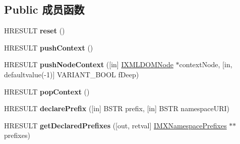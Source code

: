\subsection*{Public 成员函数}
\begin{DoxyCompactItemize}
\item 
\mbox{\label{interface_m_s_x_m_l2_1_1_i_v_b_m_x_namespace_manager_ab5f2c32051fd28c01e1dd0f8f3be944e}} 
H\+R\+E\+S\+U\+LT {\bfseries reset} ()
\item 
\mbox{\label{interface_m_s_x_m_l2_1_1_i_v_b_m_x_namespace_manager_a4bf15211958508e9b252233668d39009}} 
H\+R\+E\+S\+U\+LT {\bfseries push\+Context} ()
\item 
\mbox{\label{interface_m_s_x_m_l2_1_1_i_v_b_m_x_namespace_manager_af3c0c8c636f2cc7122227acaa4cb1373}} 
H\+R\+E\+S\+U\+LT {\bfseries push\+Node\+Context} (\mbox{[}in\mbox{]} \hyperlink{interface_m_s_x_m_l2_1_1_i_x_m_l_d_o_m_node}{I\+X\+M\+L\+D\+O\+M\+Node} $\ast$context\+Node, \mbox{[}in, defaultvalue(-\/1)\mbox{]} V\+A\+R\+I\+A\+N\+T\+\_\+\+B\+O\+OL f\+Deep)
\item 
\mbox{\label{interface_m_s_x_m_l2_1_1_i_v_b_m_x_namespace_manager_ac7116c10d6e058ae6296215039097d51}} 
H\+R\+E\+S\+U\+LT {\bfseries pop\+Context} ()
\item 
\mbox{\label{interface_m_s_x_m_l2_1_1_i_v_b_m_x_namespace_manager_a3478b6af818b070a44a45be29116ee26}} 
H\+R\+E\+S\+U\+LT {\bfseries declare\+Prefix} (\mbox{[}in\mbox{]} B\+S\+TR prefix, \mbox{[}in\mbox{]} B\+S\+TR namespace\+U\+RI)
\item 
\mbox{\label{interface_m_s_x_m_l2_1_1_i_v_b_m_x_namespace_manager_aa0bc0b731146f37cdca55ce4a39535e5}} 
H\+R\+E\+S\+U\+LT {\bfseries get\+Declared\+Prefixes} (\mbox{[}out, retval\mbox{]} \hyperlink{interface_m_s_x_m_l2_1_1_i_m_x_namespace_prefixes}{I\+M\+X\+Namespace\+Prefixes} $\ast$$\ast$prefixes)
\item 
\mbox{\label{interface_m_s_x_m_l2_1_1_i_v_b_m_x_namespace_manager_a97a89bbf290999f5b88394a698fce4ae}} 
$$
\end{DoxyCompactItemize}
